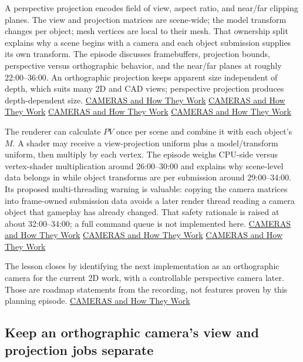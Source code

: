 A perspective projection encodes field of view, aspect ratio, and near/far clipping planes. The view and projection matrices are scene-wide; the model transform changes per object; mesh vertices are local to their mesh. That ownership split explains why a scene begins with a camera and each object submission supplies its own transform. The episode discusses framebuffers, projection bounds, perspective versus orthographic behavior, and the near/far planes at roughly 22:00--36:00. An orthographic projection keeps apparent size independent of depth, which suits many 2D and CAD views; perspective projection produces depth-dependent size. \href{https://www.youtube.com/watch?v=LfbqtmqxX04&t=1320s}{CAMERAS and How They Work} \href{https://www.youtube.com/watch?v=LfbqtmqxX04&t=1560s}{CAMERAS and How They Work} \href{https://www.youtube.com/watch?v=LfbqtmqxX04&t=1800s}{CAMERAS and How They Work} \href{https://www.youtube.com/watch?v=LfbqtmqxX04&t=2100s}{CAMERAS and How They Work}

The renderer can calculate \(PV\) once per scene and combine it with each object's \(M\). A shader may receive a view-projection uniform plus a model/transform uniform, then multiply by each vertex. The episode weighs CPU-side versus vertex-shader multiplication around 26:00--30:00 and explains why scene-level data belongs in  while object transforms are per submission around 29:00--34:00. Its proposed multi-threading warning is valuable: copying the camera matrices into frame-owned submission data avoids a later render thread reading a camera object that gameplay has already changed. That safety rationale is raised at about 32:00--34:00; a full command queue is not implemented here. \href{https://www.youtube.com/watch?v=LfbqtmqxX04&t=1560s}{CAMERAS and How They Work} \href{https://www.youtube.com/watch?v=LfbqtmqxX04&t=1740s}{CAMERAS and How They Work} \href{https://www.youtube.com/watch?v=LfbqtmqxX04&t=1920s}{CAMERAS and How They Work}

The lesson closes by identifying the next implementation as an orthographic camera for the current 2D work, with a controllable perspective camera later. Those are roadmap statements from the recording, not features proven by this planning episode. \href{https://www.youtube.com/watch?v=LfbqtmqxX04&t=2220s}{CAMERAS and How They Work}

\subsection{Keep an orthographic camera's view and projection jobs separate}\label{06-engine-ii-ch026-keep-an-orthographic-cameras-view-and-projection-jobs-separate}

